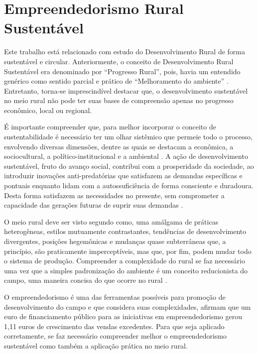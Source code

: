 \section{Empreendedorismo Rural Sustentável}

Este trabalho está relacionado com estudo do Desenvolvimento Rural de forma sustentável e circular. Anteriormente, o conceito de Desenvolvimento Rural Sustentável era denominado por “Progresso Rural”, pois, havia um entendido genérico como sentido parcial e prático de “Melhoramento do ambiente” \cite{almeida_da_1995}. Entretanto, torna-se imprescindível destacar que, o desenvolvimento sustentável no meio rural não pode ter suas bases de compreensão apenas no progresso econômico, local ou regional.

É importante compreender que, para melhor incorporar o conceito de sustentabilidade é necessário ter um olhar sistêmico que permeie todo o processo, envolvendo diversas dimensões, dentre as quais se destacam a econômica, a sociocultural, a político-institucional e a ambiental \cite{vieira_politica_2015}. A ação de desenvolvimento sustentável, fruto do avanço social, contribui com a prosperidade da sociedade, ao introduzir inovações anti-predatórias que satisfazem as demandas específicas e pontuais enquanto lidam com a autossuficiência de forma consciente e duradoura. Desta forma satisfazem as necessidades no presente, sem comprometer a capacidade das gerações futuras de suprir suas demandas \cite{onu_sustainable_2016}. 


O meio rural deve ser visto segundo \cite{kageyama_desenvolvimento_2008} como, uma amálgama de práticas heterogêneas, estilos mutuamente contrastantes, tendências de desenvolvimento divergentes, posições hegemônicas e mudanças quase subterrâneas que, a princípio, são praticamente imperceptíveis, mas que, por fim, podem mudar todo o sistema de produção. Compreender a complexidade do rural se faz necessário uma vez que a simples padronização do ambiente é um conceito reducionista do campo, uma maneira concisa do que ocorre no rural \cite{van_der_ploeg_trajetorias_2011}.

O empreendedorismo é uma das ferramentas possíveis para promoção de desenvolvimento do campo e que considera suas complexidades,  afirmam que um euro de financiamento público para as iniciativas em empreendedorismo gerou 1,11 euros de crescimento das vendas excedentes. Para que seja aplicado corretamente, se faz necessário compreender melhor o empreendedorismo sustentável como também a aplicação prática no meio rural. 

